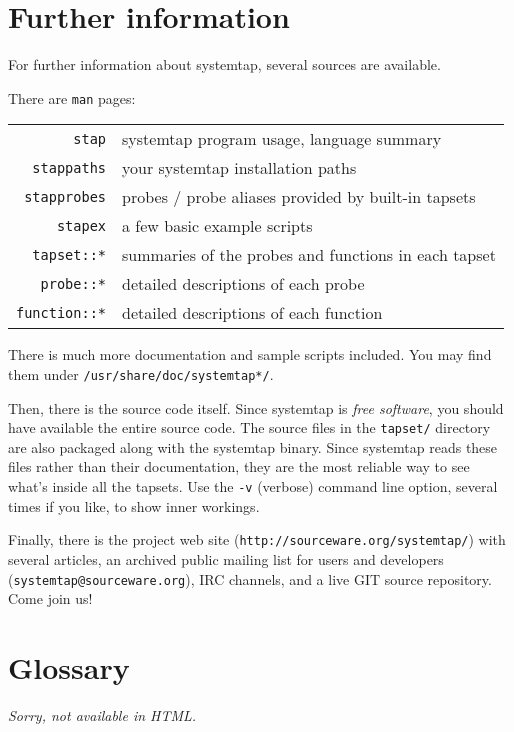 \documentclass{article}
\renewcommand{\nomenclature}[2]{}
\begin{document}
\section{Further information}

For further information about systemtap, several sources are available.

There are \verb+man+ pages:

\begin{tabular}{rl}
\verb+stap+ & systemtap program usage, language summary \\
\verb+stappaths+ & your systemtap installation paths \\
\verb+stapprobes+ & probes / probe aliases provided by built-in tapsets \\
\verb+stapex+ & a few basic example scripts \\
\verb+tapset::*+ & summaries of the probes and functions in each tapset \\
\verb+probe::*+ & detailed descriptions of each probe \\
\verb+function::*+ & detailed descriptions of each function
\end{tabular}

There is much more documentation and sample scripts included.  You
may find them under \verb+/usr/share/doc/systemtap*/+.

Then, there is the source code itself.  Since systemtap is {\em free
software}, you should have available the entire source code.  The
source files in the \verb+tapset/+ directory are also packaged along
with the systemtap binary.  Since systemtap reads these files rather
than their documentation, they are the most reliable way to see what's
inside all the tapsets.  Use the \verb+-v+ (verbose) command line
option, several times if you like, to show inner workings.
\nomenclature{free software}{Software licensed under terms such as the
GNU GPL, which aims to enforce certain specified user freedoms such
as study, modification, and sharing.}

Finally, there is the project web site
(\verb+http://sourceware.org/systemtap/+) with several articles,
an archived public mailing list for users and developers
(\verb+systemtap@sourceware.org+), IRC channels,
and a live GIT source repository.  Come join us!


\appendix

\section{Glossary}
\renewcommand{\nomname}{}
\printglossary
\begin{htmlonly}
{\em Sorry, not available in HTML.}
\end{htmlonly}
\end{document}
